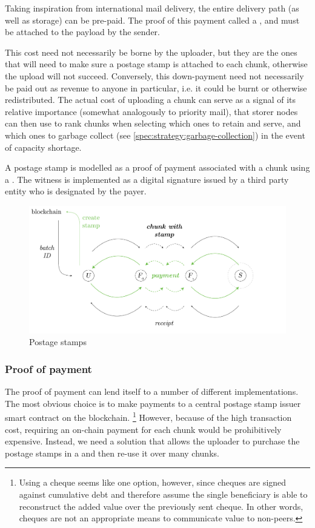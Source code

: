Taking inspiration from international mail delivery, the entire delivery path (as well as storage) can be pre-paid. The proof of this payment called a , and must be attached to the payload by the sender.

This cost need not necessarily be borne by the uploader, but they are the ones that will need to make sure a postage stamp is attached to each chunk, otherwise the upload will not succeed. Conversely, this down-payment need not necessarily be paid out as revenue to anyone in particular, i.e. it could be burnt or otherwise redistributed. The actual cost of uploading a chunk can serve as a signal of its relative importance (somewhat analogously to priority mail), that storer nodes can then use to rank chunks when selecting which ones to retain and serve, and which ones to garbage collect (see \ref{spec:strategy:garbage-collection}) in the event of capacity shortage.

A postage stamp is modelled as a proof of payment associated with a chunk using a . The witness is implemented as a digital signature issued by a third party entity who is designated by the payer.


\begin{figure}[htbp]
\centering
  \includegraphics[width=\textwidth]{fig/postage-stamp.pdf}
\caption[Postage stamps  \statusgreen]{Postage stamps}
\label{fig:postage-stamps}
\end{figure}

\subsubsection{Proof of payment}

The proof of payment can lend itself to a number of different implementations. The most obvious choice is to make payments to a central postage stamp issuer smart contract on the blockchain.%
%
\footnote{Using a cheque seems like one option, however, since cheques are signed against cumulative debt and therefore assume the single beneficiary is able to reconstruct the added value over the previously sent cheque. In other words, cheques are not an appropriate means to communicate value to non-peers.}
%
However, because of the high transaction cost, requiring an on-chain payment for each chunk would be prohibitively expensive. Instead, we need a solution that allows the uploader to purchase the postage stamps in a  and then re-use it over many chunks. 


